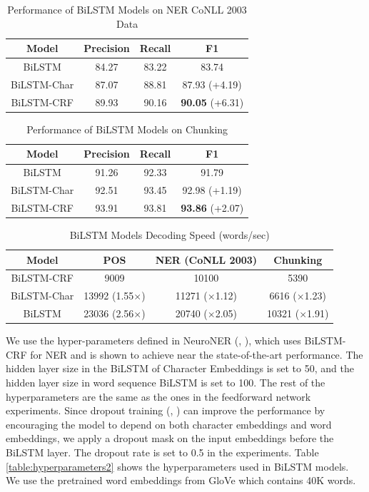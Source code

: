 \begin{table}[]
\centering
\caption{Performance of BiLSTM Models on NER CoNLL 2003 Data}
\label{table:lstm-table2}
\begin{tabular}{|c|c|c|c|}
\hline
Model  & Precision & Recall & F1      \\ \hline
BiLSTM  & 84.27 & 83.22 & 83.74     \\ \hline
BiLSTM-Char & 87.07 & 88.81 & 87.93 (+4.19)\\ \hline
BiLSTM-CRF & 89.93 & 90.16 & \textbf{90.05} (+6.31)  \\ \hline
\end{tabular}
\end{table}

\begin{table}[]
\centering
\caption{Performance of BiLSTM Models on Chunking}
\label{table:lstm-table3}
\begin{tabular}{|c|c|c|c|}
\hline
Model  & Precision & Recall & F1      \\ \hline
BiLSTM  & 91.26 & 92.33 & 91.79    \\ \hline
BiLSTM-Char & 92.51 & 93.45 & 92.98 (+1.19)\\ \hline
BiLSTM-CRF & 93.91 & 93.81 & \textbf{93.86} (+2.07)  \\ \hline
\end{tabular}
\end{table}

\begin{table}[]
\centering
\caption{BiLSTM Models Decoding Speed (words/sec)}
\label{table:lstm-table4}
\begin{tabular}{|c|c|c|c|}
\hline
Model       & POS & NER (CoNLL 2003) & Chunking    \\ \hline
BiLSTM-CRF    & 9009     & 10100   &5390\\ \hline
BiLSTM-Char        & 13992 (1.55$\times$)    & 11271 ($\times$1.12) &6616 ($\times$1.23) \\ \hline
BiLSTM             & 23036 (2.56$\times$)   & 20740 ($\times$2.05)  &10321 ($\times$1.91)\\ \hline
\end{tabular}
\end{table}

We use the hyper-parameters defined in NeuroNER  (\citeauthor{2017neuroner}, \citeyear{2017neuroner}), which uses BiLSTM-CRF for NER and is shown to achieve near the state-of-the-art performance. The hidden layer size in the BiLSTM of Character Embeddings is set to 50, and the hidden layer size in word sequence BiLSTM is set to 100. The rest of the hyperparameters are the same as the ones in the feedforward network experiments. Since dropout training (\citeauthor{hinton2012improving}, \citeyear{hinton2012improving}) can improve the performance by encouraging the model to depend on both character embeddings and word embeddings, we apply a dropout mask on the input embeddings before the BiLSTM layer. The dropout rate is set to 0.5 in the experiments. Table \ref{table:hyperparameters2} shows the hyperparameters used in BiLSTM models. We use the pretrained word embeddings from GloVe which contains 40K words.


